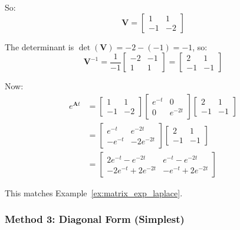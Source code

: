 \begin{example}
So:
\begin{equation}
\mathbf{V} = \begin{bmatrix} 1 & 1 \\ -1 & -2 \end{bmatrix}
\end{equation}

The determinant is $\det(\mathbf{V}) = -2 - (-1) = -1$, so:
\begin{equation}
\mathbf{V}^{-1} = \frac{1}{-1}\begin{bmatrix} -2 & -1 \\ 1 & 1 \end{bmatrix} = \begin{bmatrix} 2 & 1 \\ -1 & -1 \end{bmatrix}
\end{equation}

Now:
\begin{align}
e^{\mathbf{A}t} &= \begin{bmatrix} 1 & 1 \\ -1 & -2 \end{bmatrix}\begin{bmatrix} e^{-t} & 0 \\ 0 & e^{-2t} \end{bmatrix}\begin{bmatrix} 2 & 1 \\ -1 & -1 \end{bmatrix} \\
&= \begin{bmatrix} e^{-t} & e^{-2t} \\ -e^{-t} & -2e^{-2t} \end{bmatrix}\begin{bmatrix} 2 & 1 \\ -1 & -1 \end{bmatrix} \\
&= \begin{bmatrix} 2e^{-t} - e^{-2t} & e^{-t} - e^{-2t} \\ -2e^{-t} + 2e^{-2t} & -e^{-t} + 2e^{-2t} \end{bmatrix}
\end{align}

This matches Example~\ref{ex:matrix_exp_laplace}.
\end{example}

\subsubsection{Method 3: Diagonal Form (Simplest)}

